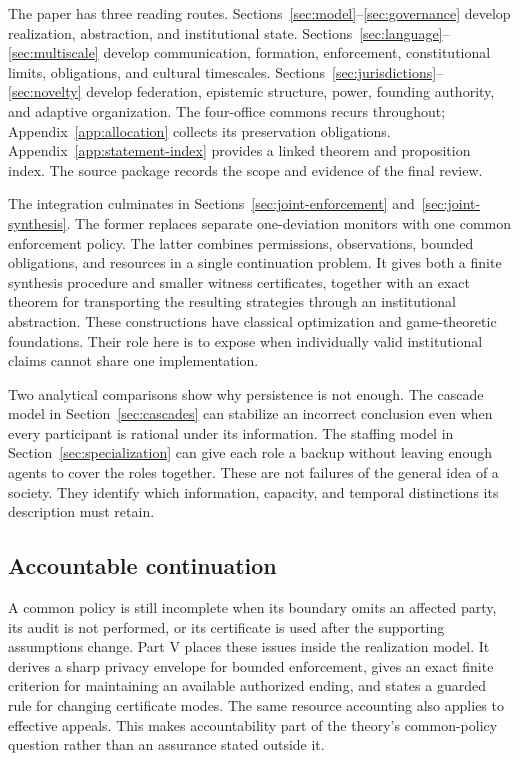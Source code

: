 \documentclass[11pt,letterpaper]{article}
\theoremstyle{plain}
\theoremstyle{definition}
\theoremstyle{remark}
\begin{document}
The paper has three reading routes. Sections~\ref{sec:model}--\ref{sec:governance} develop realization, abstraction, and institutional state. Sections~\ref{sec:language}--\ref{sec:multiscale} develop communication, formation, enforcement, constitutional limits, obligations, and cultural timescales. Sections~\ref{sec:jurisdictions}--\ref{sec:novelty} develop federation, epistemic structure, power, founding authority, and adaptive organization. The four-office commons recurs throughout; Appendix~\ref{app:allocation} collects its preservation obligations. Appendix~\ref{app:statement-index} provides a linked theorem and proposition index. The source package records the scope and evidence of the final review.

The integration culminates in Sections~\ref{sec:joint-enforcement} and~\ref{sec:joint-synthesis}. The former replaces separate one-deviation monitors with one common enforcement policy. The latter combines permissions, observations, bounded obligations, and resources in a single continuation problem. It gives both a finite synthesis procedure and smaller witness certificates, together with an exact theorem for transporting the resulting strategies through an institutional abstraction. These constructions have classical optimization and game-theoretic foundations. Their role here is to expose when individually valid institutional claims cannot share one implementation.

Two analytical comparisons show why persistence is not enough. The cascade model in Section~\ref{sec:cascades} can stabilize an incorrect conclusion even when every participant is rational under its information. The staffing model in Section~\ref{sec:specialization} can give each role a backup without leaving enough agents to cover the roles together. These are not failures of the general idea of a society. They identify which information, capacity, and temporal distinctions its description must retain.

\subsection{Accountable continuation}
A common policy is still incomplete when its boundary omits an affected party, its audit is not performed, or its certificate is used after the supporting assumptions change. Part V places these issues inside the realization model. It derives a sharp privacy envelope for bounded enforcement, gives an exact finite criterion for maintaining an available authorized ending, and states a guarded rule for changing certificate modes. The same resource accounting also applies to effective appeals. This makes accountability part of the theory's common-policy question rather than an assurance stated outside it.
\end{document}
